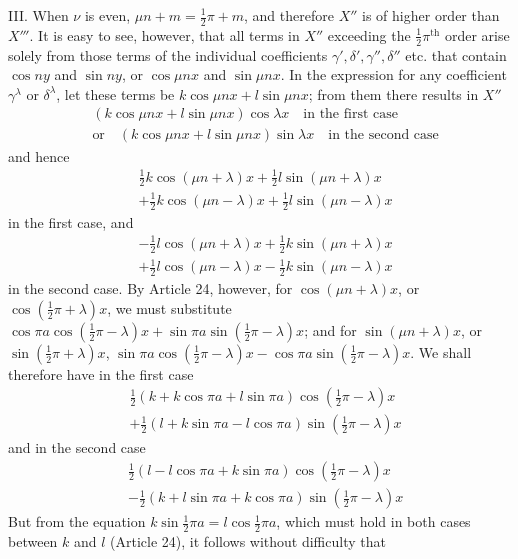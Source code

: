 III. When $\nu$ is even, $\mu n+m=\tfrac12\pi+m$, and therefore $X''$ is of higher order
than $X'''$. It is easy to see, however, that all terms in $X''$ exceeding the
$\tfrac12\pi^{\mathrm{th}}$ order arise solely from those terms of the individual
coefficients $\gamma',\delta',\gamma'',\delta''$ etc. that contain $\cos ny$ and
$\sin ny$, or $\cos\mu nx$ and $\sin\mu nx$. In the expression for
any coefficient $\gamma^\lambda$ or $\delta^\lambda$, let these terms be $k\cos\mu nx+l\sin\mu nx$;
from them there results in $X''$
\[
\begin{aligned}
&(k\cos\mu nx+l\sin\mu nx)\cos\lambda x\quad\text{in the first case}\\[5pt]
&\text{or}\quad(k\cos\mu nx+l\sin\mu nx)\sin\lambda x\quad\text{in the second case}
\end{aligned}
\]
and hence
\[
\begin{aligned}
&\tfrac12k\cos(\mu n+\lambda)x+\tfrac12l\sin(\mu n+\lambda)x\\[5pt]
&+\tfrac12k\cos(\mu n-\lambda)x+\tfrac12l\sin(\mu n-\lambda)x
\end{aligned}
\]
in the first case, and
\[
\begin{aligned}
&-\tfrac12l\cos(\mu n+\lambda)x+\tfrac12k\sin(\mu n+\lambda)x\\[5pt]
&+\tfrac12l\cos(\mu n-\lambda)x-\tfrac12k\sin(\mu n-\lambda)x
\end{aligned}
\]
in the second case. By Article 24, however, for $\cos(\mu n+\lambda)x$,
or $\cos(\tfrac12\pi+\lambda)x$, we must substitute $\cos\pi a\cos(\tfrac12\pi-\lambda)x+\sin\pi a\sin(\tfrac12\pi-\lambda)x$;
and for $\sin(\mu n+\lambda)x$, or $\sin(\tfrac12\pi+\lambda)x$,
$\sin\pi a\cos(\tfrac12\pi-\lambda)x-\cos\pi a\sin(\tfrac12\pi-\lambda)x$.
We shall therefore have in the first case
\[
\begin{aligned}
&\tfrac12(k+k\cos\pi a+l\sin\pi a)\cos(\tfrac12\pi-\lambda)x\\[5pt]
&+\tfrac12(l+k\sin\pi a-l\cos\pi a)\sin(\tfrac12\pi-\lambda)x
\end{aligned}
\]
and in the second case
\[
\begin{aligned}
&\tfrac12(l-l\cos\pi a+k\sin\pi a)\cos(\tfrac12\pi-\lambda)x\\[5pt]
&-\tfrac12(k+l\sin\pi a+k\cos\pi a)\sin(\tfrac12\pi-\lambda)x
\end{aligned}
\]
But from the equation $k\sin\tfrac12\pi a=l\cos\tfrac12\pi a$, which must hold in both cases
between $k$ and $l$ (Article 24), it follows without difficulty that

